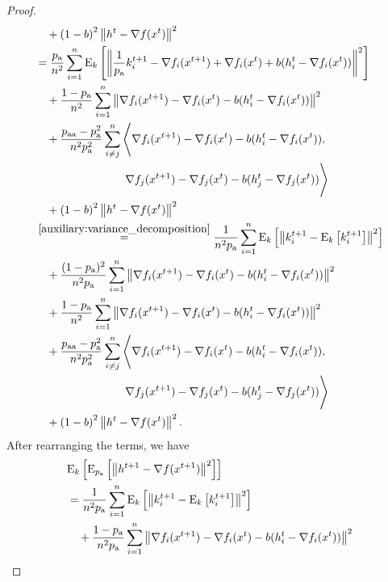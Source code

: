 \documentclass{article}
\begin{document}
\begin{proof}
\begin{align*}
    &\quad + \left(1 - b\right)^2 \left\| h^{t} - \nabla f(x^{t}) \right\|^2 \\
    &=\frac{p_{\textnormal{a}}}{n^2}\sum_{i=1}^n {\rm E}_{k}\left[\left\| \frac{1}{p_{\textnormal{a}}}k^{t+1}_i - \nabla f_i(x^{t+1}) + \nabla f_i(x^{t}) + b(h^t_i - \nabla f_i(x^{t})) \right\|^2\right] \\
    &\quad + \frac{1 - p_{\textnormal{a}}}{n^2}\sum_{i=1}^n \left\| \nabla f_i(x^{t+1}) - \nabla f_i(x^{t}) - b(h^t_i - \nabla f_i(x^{t})) \right\|^2 \\
    &\quad +\frac{p_{\textnormal{aa}} - p_{\textnormal{a}}^2}{n^2 p_{\textnormal{a}}^2}\sum_{i \neq j}^n\Bigg\langle \nabla f_i(x^{t+1}) - \nabla f_i(x^{t}) - b(h^t_i - \nabla f_i(x^{t})), \\
    &\qquad\qquad\qquad\qquad \nabla f_j(x^{t+1}) - \nabla f_j(x^{t}) - b(h^t_j - \nabla f_j(x^{t}))\Bigg\rangle \\
    &\quad + \left(1 - b\right)^2 \left\| h^{t} - \nabla f(x^{t}) \right\|^2 \\
    &\overset{\eqref{auxiliary:variance_decomposition}}{=}\frac{1}{n^2 p_{\textnormal{a}}}\sum_{i=1}^n {\rm E}_{k}\left[\left\| k^{t+1}_i - {\rm E}_{k}\left[k^{t+1}_i\right] \right\|^2\right] \\
    &\quad + \frac{(1 - p_{\textnormal{a}})^2}{n^2 p_{\textnormal{a}}}\sum_{i=1}^n \left\| \nabla f_i(x^{t+1}) - \nabla f_i(x^{t}) - b(h^t_i - \nabla f_i(x^{t})) \right\|^2 \\
    &\quad + \frac{1 - p_{\textnormal{a}}}{n^2}\sum_{i=1}^n \left\| \nabla f_i(x^{t+1}) - \nabla f_i(x^{t}) - b(h^t_i - \nabla f_i(x^{t})) \right\|^2 \\
    &\quad +\frac{p_{\textnormal{aa}} - p_{\textnormal{a}}^2}{n^2 p_{\textnormal{a}}^2}\sum_{i \neq j}^n\Bigg\langle \nabla f_i(x^{t+1}) - \nabla f_i(x^{t}) - b(h^t_i - \nabla f_i(x^{t})), \\
    &\qquad\qquad\qquad\qquad \nabla f_j(x^{t+1}) - \nabla f_j(x^{t}) - b(h^t_j - \nabla f_j(x^{t}))\Bigg\rangle \\
    &\quad + \left(1 - b\right)^2 \left\| h^{t} - \nabla f(x^{t}) \right\|^2. \\
  \end{align*}
  After rearranging the terms, we have
  \begin{align*}
    &\ExpSub{k}{\ExpSub{\probavailable}{\norm{h^{t+1} - \nabla f(x^{t+1})}^2}} \\
    &=\frac{1}{n^2 \probavailable}\sum_{i=1}^n \ExpSub{k}{\norm{k^{t+1}_i - \ExpSub{k}{k^{t+1}_i}}^2} \\
    &\quad + \frac{1 - \probavailable}{n^2 \probavailable}\sum_{i=1}^n \norm{\nabla f_i(x^{t+1}) - \nabla f_i(x^{t}) - b(h^t_i - \nabla f_i(x^{t}))}^2 \\

\end{align*}
\end{proof}
\end{document}

